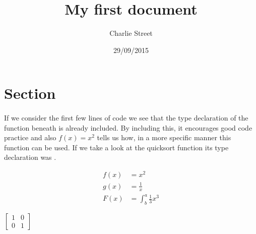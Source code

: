 \documentclass{article}
\title{My first document}
\date{29/09/2015}
\author{Charlie Street}
\begin{document}
    \maketitle
    \newpage
    
    \section{Section}
    
    \paragraph{}
        If we consider the first few lines of code we see that the type declaration of the function beneath is already included. By including this, it encourages good code practice and also $f(x) = x^2$ tells us how, in a more specific manner this function can be used. If we take a look at the quicksort function its type declaration was . 

	 \begin{align*}
  		f(x) &= x^2 \\
		g(x) &= \frac{1}{x}\\
		F(x) &= \int^a_b \frac{1}{3}x^3
	\end{align*}

	$\left[
	\begin{matrix}
		1 & 0\\
		0 & 1
	\end{matrix}
	\right]$
    
\end{document}
